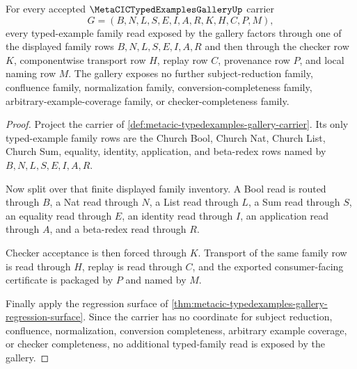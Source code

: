 \begin{theorem}
\label{thm:metacic-typedexamples-gallery-typed-family-coverage}
For every accepted $\MetaCICTypedExamplesGalleryUp$ carrier
$$
G=(B,N,L,S,E,I,A,R,K,H,C,P,M),
$$
every typed-example family read exposed by the gallery factors through one of the displayed family rows $B,N,L,S,E,I,A,R$ and then through the checker row $K$, componentwise transport row $H$, replay row $C$, provenance row $P$, and local naming row $M$. The gallery exposes no further subject-reduction family, confluence family, normalization family, conversion-completeness family, arbitrary-example-coverage family, or checker-completeness family.
\end{theorem}
\begin{proof}
Project the carrier of \autoref{def:metacic-typedexamples-gallery-carrier}. Its only typed-example family rows are the Church Bool, Church Nat, Church List, Church Sum, equality, identity, application, and beta-redex rows named by $B,N,L,S,E,I,A,R$.

Now split over that finite displayed family inventory. A Bool read is routed through $B$, a Nat read through $N$, a List read through $L$, a Sum read through $S$, an equality read through $E$, an identity read through $I$, an application read through $A$, and a beta-redex read through $R$.

Checker acceptance is then forced through $K$. Transport of the same family row is read through $H$, replay is read through $C$, and the exported consumer-facing certificate is packaged by $P$ and named by $M$.

Finally apply the regression surface of \autoref{thm:metacic-typedexamples-gallery-regression-surface}. Since the carrier has no coordinate for subject reduction, confluence, normalization, conversion completeness, arbitrary example coverage, or checker completeness, no additional typed-family read is exposed by the gallery.
\end{proof}

